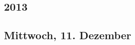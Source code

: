 \documentclass[11pt, twoside, a4paper]{article}
\begin{document}
	\tableofcontents
	\clearpage
	\begin{multicols}{2}
		\section{2013}
		\subsection{Mittwoch, 11. Dezember}
		\blindtext
	\end{multicols}
\end{document}
